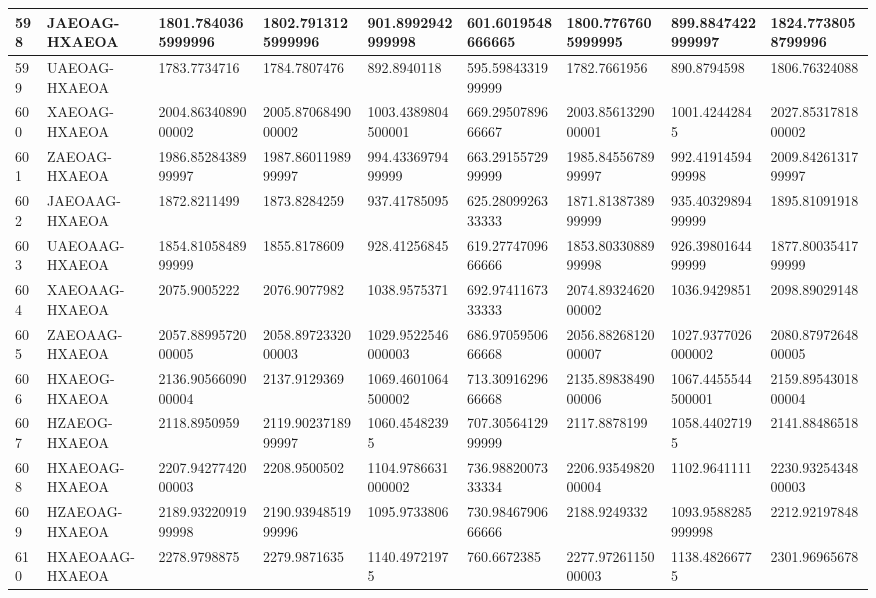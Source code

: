 {\begin{longtable}{|l|l|l|l|l|l|l|l|l|}
        598 & JAEOAG-HXAEOA & 1801.7840365999996 & 1802.7913125999996 & 901.8992942999998 & 601.6019548666665 & 1800.7767605999995 & 899.8847422999997 & 1824.7738058799996 \\ \hline
        599 & UAEOAG-HXAEOA & 1783.7734716 & 1784.7807476 & 892.8940118 & 595.5984331999999 & 1782.7661956 & 890.8794598 & 1806.76324088 \\ \hline
        600 & XAEOAG-HXAEOA & 2004.8634089000002 & 2005.8706849000002 & 1003.4389804500001 & 669.2950789666667 & 2003.8561329000001 & 1001.42442845 & 2027.8531781800002 \\ \hline
        601 & ZAEOAG-HXAEOA & 1986.8528438999997 & 1987.8601198999997 & 994.4336979499999 & 663.2915572999999 & 1985.8455678999997 & 992.4191459499998 & 2009.8426131799997 \\ \hline
        602 & JAEOAAG-HXAEOA & 1872.8211499 & 1873.8284259 & 937.41785095 & 625.2809926333333 & 1871.8138738999999 & 935.4032989499999 & 1895.81091918 \\ \hline
        603 & UAEOAAG-HXAEOA & 1854.8105848999999 & 1855.8178609 & 928.41256845 & 619.2774709666666 & 1853.8033088999998 & 926.3980164499999 & 1877.8003541799999 \\ \hline
        604 & XAEOAAG-HXAEOA & 2075.9005222 & 2076.9077982 & 1038.9575371 & 692.9741167333333 & 2074.8932462000002 & 1036.9429851 & 2098.89029148 \\ \hline
        605 & ZAEOAAG-HXAEOA & 2057.8899572000005 & 2058.8972332000003 & 1029.9522546000003 & 686.9705950666668 & 2056.8826812000007 & 1027.9377026000002 & 2080.8797264800005 \\ \hline
        606 & HXAEOG-HXAEOA & 2136.9056609000004 & 2137.9129369 & 1069.4601064500002 & 713.3091629666668 & 2135.8983849000006 & 1067.4455544500001 & 2159.8954301800004 \\ \hline
        607 & HZAEOG-HXAEOA & 2118.8950959 & 2119.9023718999997 & 1060.45482395 & 707.3056412999999 & 2117.8878199 & 1058.44027195 & 2141.88486518 \\ \hline
        608 & HXAEOAG-HXAEOA & 2207.9427742000003 & 2208.9500502 & 1104.9786631000002 & 736.9882007333334 & 2206.9354982000004 & 1102.9641111 & 2230.9325434800003 \\ \hline
        609 & HZAEOAG-HXAEOA & 2189.9322091999998 & 2190.9394851999996 & 1095.9733806 & 730.9846790666666 & 2188.9249332 & 1093.9588285999998 & 2212.92197848 \\ \hline
        610 & HXAEOAAG-HXAEOA & 2278.9798875 & 2279.9871635 & 1140.49721975 & 760.6672385 & 2277.9726115000003 & 1138.48266775 & 2301.96965678 \\ \hline

\end{longtable}}
